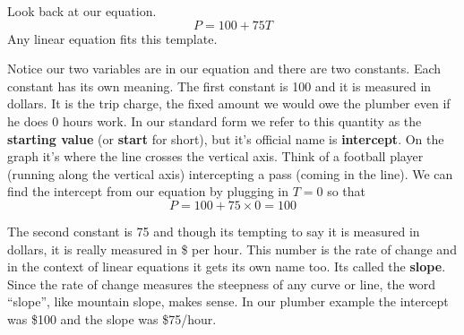 Look back at our equation.  $$P = 100 + 75T$$  Any linear equation fits this template. 

\bigskip
\bigskip

Notice our two variables are in our equation and there are two constants. Each constant has its own meaning.  The first constant is 100 and it is measured in dollars.  It is the trip charge, the fixed amount we would owe the plumber even if he does 0 hours work.  In our standard form we refer to this quantity as the \textbf{starting value} (or \textbf{start} for short), but it's official name is \textbf{intercept}.  On the graph it's where the line crosses the vertical axis.  Think of a football player (running along the vertical axis) intercepting a pass (coming in the line).  We can find the intercept from our equation by plugging in $T = 0$ so that $$P = 100 + 75 \times 0 = 100$$

The second constant is 75 and though its tempting to say it is measured in dollars, it is really measured in \$ per hour.  This number is the rate of change and in the context of linear equations it gets its own name too.  Its called the \textbf{slope}.  Since the rate of change measures the steepness of any curve or line, the word ``slope'', like mountain slope, makes sense.  In our plumber example the intercept was \$100 and the slope was \$75/hour.  


%